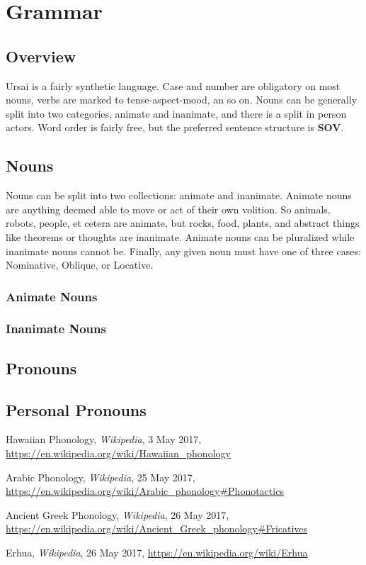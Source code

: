 \documentclass[11pt,letterpaper]{article}
\begin{document}
\pagebreak		
\section{Grammar}
	\subsection{Overview}
	Ursai is a fairly synthetic language.  Case and number are obligatory on most nouns, verbs are marked to tense-aspect-mood, an so on.  Nouns can be generally split into two categories, animate and inanimate, and there is a split in  person actors.  Word order is fairly free, but the preferred sentence structure is \textbf{SOV}.
	\subsection{Nouns}\label{nouns}
	Nouns can be split into two collections: animate and inanimate.  Animate nouns are anything deemed able to move or act of their own volition.  So animals, robots, people, et cetera are animate, but rocks, food, plants, and abstract things like theorems or thoughts are inanimate.  Animate nouns can be pluralized while inanimate nouns cannot be.  Finally, any given noun must have one of three cases: Nominative, Oblique, or Locative.
		\subsubsection{Animate Nouns}\label{animate}
		\subsubsection{Inanimate Nouns}\label{inanimate}
	\subsection{Pronouns}\label{pronouns}
		\subsection{Personal Pronouns}\label{personal}
	
\pagebreak
\begin{thebibliography}{99}
	 Hawaiian Phonology, \textit{Wikipedia}, 3 May 2017,
    \url{https://en.wikipedia.org/wiki/Hawaiian_phonology}
    
     Arabic Phonology, \textit{Wikipedia}, 25 May 2017,
    \url{https://en.wikipedia.org/wiki/Arabic_phonology#Phonotactics}
    
     Ancient Greek Phonology, \textit{Wikipedia}, 26 May 2017,
    \url{https://en.wikipedia.org/wiki/Ancient_Greek_phonology#Fricatives}

	 Erhua, \textit{Wikipedia}, 26 May 2017,
	\url{https://en.wikipedia.org/wiki/Erhua}
\end{thebibliography}
\end{document}
